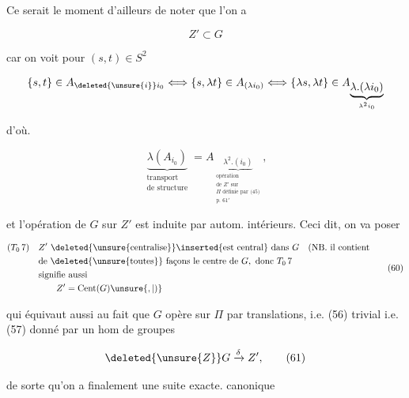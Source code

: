 
Ce serait le moment d'ailleurs de noter que l'on a

\[
Z'\subset G \tag*{(58)}
\]

car on voit  pour $(s,t)\in S^2$

\[
\{s,t\}\in A_{\deleted{\unsure{i}}i_0}\Longleftrightarrow
\{s,\lambda t\}\in A_{(\lambda i_0)}\Longleftrightarrow
\{\lambda s,\lambda t\}\in A_{\underbrace{\lambda.(\lambda i_0)}_{\lambda^2 i_0}}
\]

d'où.

\[
\underbrace{\lambda(A_{i_0})}_{\substack{\text{transport}\\\text{de structure}}}
=A_{\underbrace{\lambda^2.(i_0)}_{\substack{\text{opération}\\\text{de }Z'\text{ sur}\\\Pi\text{ définie par (45)}\\\text{p. }61'}}}, \tag*{(59)}
\]


et l'opération de $G$ sur $Z'$ est induite par autom. intérieurs. Ceci dit, on va poser

\[
\begin{aligned}
(T_0\,7)\quad&Z'\ \deleted{\text{\unsure{centralise}}}\inserted{\text{est central}}\text{ dans }G\quad\text{(NB. il contient}\\
&\text{de }\deleted{\text{\unsure{toutes}}}\text{ façons le centre de }G,\text{ donc }T_0\,7\\
&\text{signifie aussi}\\
&\hspace{2em}Z'=\operatorname{Cent}(G)\unsure{,|)}
\end{aligned}\tag*{(60)}
\]

qui équivaut aussi au fait que $G$ opère sur $\Pi$ par translations, i.e. (56) trivial i.e. (57) donné par un hom de groupes

\[
\deleted{\unsure{Z}}G\xrightarrow{\delta}Z', \tag*{(61)}
\]

de sorte qu'on a finalement une suite exacte. canonique
